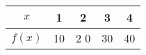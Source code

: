 \documentclass[11pt]{article}
\begin{document}
\begin{tabular}{|c|c|c|c|c|}
\hline
$x$ & 1 & 2 & 3 & 4 \\ \hline
$f(x)$ & 10 & 2 0& 30 & 40 \\ \hline

\end{tabular}
\end{document}
